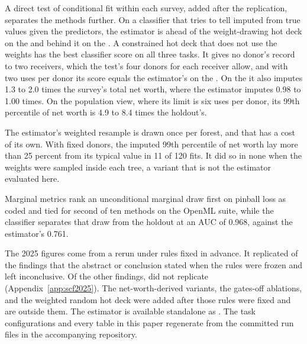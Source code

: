 A direct test of conditional fit within each survey, added after the
replication, separates the methods further. On a classifier that tries to
tell imputed from true values given the predictors, the estimator is ahead
of the weight-drawing hot deck on the \scf{} and behind it on the \cps{}. A
constrained hot deck that does not use the weights has the best classifier
score on all three tasks. It gives no donor's record to two receivers, which
the test's four donors for each receiver allow, and with two uses per donor
its score equals the estimator's on the \scf{}. On the \scf{} it also
imputes 1.3 to 2.0 times the
survey's total net worth, where the estimator imputes 0.98 to 1.00 times.
On the population view, where its limit is six uses per donor, its 99th
percentile of net worth is 4.9 to 8.4 times the holdout's.

The estimator's weighted resample is drawn once per forest, and that has a
cost of its own. With fixed donors, the imputed 99th percentile of net worth
lay more than 25 percent from its typical value in 11 of 120 fits. It did so
in none when the weights were sampled inside each tree, a variant that is
not the estimator evaluated here.

Marginal metrics rank an unconditional marginal draw first on \scf{} pinball
loss as coded and tied for second of ten methods on the OpenML suite, while
the classifier separates that draw from the holdout at an AUC of 0.968,
against the estimator's 0.761.

The 2025 figures come from a rerun under rules fixed in advance. It
replicated  of the 
findings that the abstract or conclusion stated when the rules were frozen
and left  inconclusive. Of the
 other findings,  did not
replicate (Appendix~\ref{app:scf2025}). The net-worth-derived variants, the
gates-off ablations, and the weighted random hot deck were added after
those rules were fixed and are outside them. The estimator is available
standalone as \populacefit{}. The task configurations and every table in
this paper regenerate from the committed run files in the accompanying
repository.
